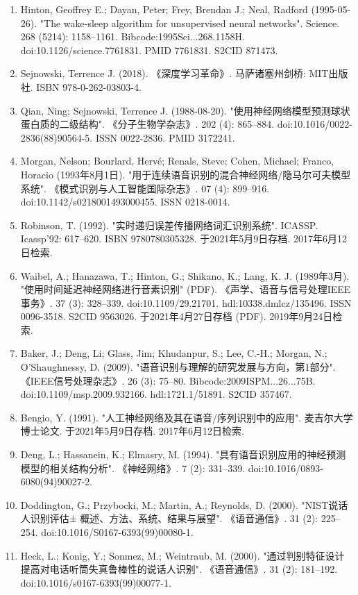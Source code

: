 \begin{enumerate}
\item Hinton, Geoffrey E.; Dayan, Peter; Frey, Brendan J.; Neal, Radford (1995-05-26). "The wake-sleep algorithm for unsupervised neural networks". Science. 268 (5214): 1158–1161. Bibcode:1995Sci...268.1158H. doi:10.1126/science.7761831. PMID 7761831. S2CID 871473.
\item Sejnowski, Terrence J. (2018). 《深度学习革命》. 马萨诸塞州剑桥: MIT出版社. ISBN 978-0-262-03803-4.
\item Qian, Ning; Sejnowski, Terrence J. (1988-08-20). "使用神经网络模型预测球状蛋白质的二级结构". 《分子生物学杂志》. 202 (4): 865–884. doi:10.1016/0022-2836(88)90564-5. ISSN 0022-2836. PMID 3172241.
\item Morgan, Nelson; Bourlard, Hervé; Renals, Steve; Cohen, Michael; Franco, Horacio (1993年8月1日). "用于连续语音识别的混合神经网络/隐马尔可夫模型系统". 《模式识别与人工智能国际杂志》. 07 (4): 899–916. doi:10.1142/s0218001493000455. ISSN 0218-0014.
\item Robinson, T. (1992). "实时递归误差传播网络词汇识别系统". ICASSP. Icassp'92: 617–620. ISBN 9780780305328. 于2021年5月9日存档. 2017年6月12日检索.
\item Waibel, A.; Hanazawa, T.; Hinton, G.; Shikano, K.; Lang, K. J. (1989年3月). "使用时间延迟神经网络进行音素识别" (PDF). 《声学、语音与信号处理IEEE事务》. 37 (3): 328–339. doi:10.1109/29.21701. hdl:10338.dmlcz/135496. ISSN 0096-3518. S2CID 9563026. 于2021年4月27日存档 (PDF). 2019年9月24日检索.
\item Baker, J.; Deng, Li; Glass, Jim; Khudanpur, S.; Lee, C.-H.; Morgan, N.; O'Shaughnessy, D. (2009). "语音识别与理解的研究发展与方向，第1部分". 《IEEE信号处理杂志》. 26 (3): 75–80. Bibcode:2009ISPM...26...75B. doi:10.1109/msp.2009.932166. hdl:1721.1/51891. S2CID 357467.
\item Bengio, Y. (1991). "人工神经网络及其在语音/序列识别中的应用". 麦吉尔大学博士论文. 于2021年5月9日存档. 2017年6月12日检索.
\item Deng, L.; Hassanein, K.; Elmasry, M. (1994). "具有语音识别应用的神经预测模型的相关结构分析". 《神经网络》. 7 (2): 331–339. doi:10.1016/0893-6080(94)90027-2.
\item Doddington, G.; Przybocki, M.; Martin, A.; Reynolds, D. (2000). "NIST说话人识别评估± 概述、方法、系统、结果与展望". 《语音通信》. 31 (2): 225–254. doi:10.1016/S0167-6393(99)00080-1.
\item Heck, L.; Konig, Y.; Sonmez, M.; Weintraub, M. (2000). "通过判别特征设计提高对电话听筒失真鲁棒性的说话人识别". 《语音通信》. 31 (2): 181–192. doi:10.1016/s0167-6393(99)00077-1.

\end{enumerate}
